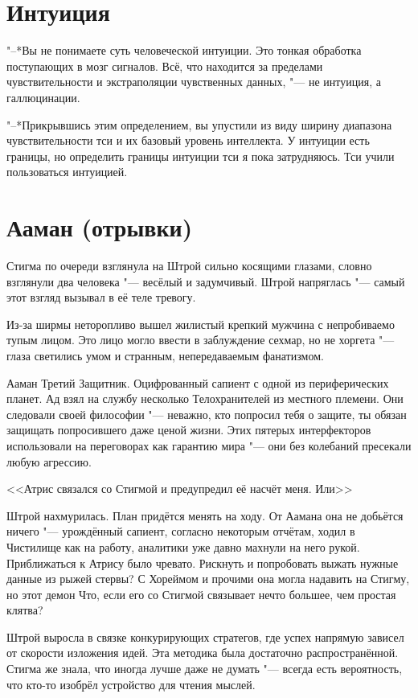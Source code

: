 \documentclass[a4paper,10pt]{book}
\newcommand{\ldotst}{\so{...}\xspace}
\newcommand{\ldotsq}{\so{?\hbox{\hspace{-.212em}}..}\xspace}
\begin{document}
\section{Интуиция}

"--*Вы не понимаете суть человеческой интуиции. Это тонкая обработка 
поступающих в мозг сигналов. Всё, что находится за пределами чувствительности и 
экстраполяции чувственных данных, "--- не интуиция, а галлюцинации.

"--*Прикрывшись этим определением, вы упустили из виду ширину диапазона 
чувствительности тси и их базовый уровень интеллекта. У интуиции есть границы, 
но определить границы интуиции тси я пока затрудняюсь. Тси учили пользоваться 
интуицией.

\section{Ааман (отрывки)}

Стигма по очереди взглянула на Штрой сильно косящими глазами, словно взглянули 
два человека "--- весёлый и задумчивый. Штрой напряглась "--- самый этот взгляд 
вызывал в её теле тревогу.

Из-за ширмы неторопливо вышел жилистый крепкий мужчина с непробиваемо тупым 
лицом. Это лицо могло ввести в заблуждение сехмар, но не хоргета "--- глаза 
светились умом и странным, непередаваемым фанатизмом.

Ааман Третий Защитник. Оцифрованный сапиент с одной из периферических планет. 
Ад взял на службу несколько Телохранителей из местного племени. Они следовали 
своей философии "--- неважно, кто попросил тебя о защите, ты обязан защищать 
попросившего даже ценой жизни. Этих пятерых интерфекторов использовали на 
переговорах как гарантию мира "--- они без колебаний пресекали любую агрессию.

<<Атрис связался со Стигмой и предупредил её насчёт меня. Или\ldotsq>>

Штрой нахмурилась. План придётся менять на ходу. От Аамана она не добьётся 
ничего "--- урождённый сапиент, согласно некоторым отчётам, ходил в Чистилище 
как на работу, аналитики уже давно махнули на него рукой. Приближаться к Атрису 
было чревато. Рискнуть и попробовать выжать нужные данные из рыжей стервы? С 
Хореймом и прочими она могла надавить на Стигму, но этот демон\ldotst Что, если 
его со Стигмой связывает нечто большее, чем простая клятва?

Штрой выросла в связке конкурирующих стратегов, где успех напрямую зависел от 
скорости изложения идей. Эта методика была достаточно распространённой. Стигма 
же знала, что иногда лучше даже не думать "--- всегда есть вероятность, что 
кто-то изобрёл устройство для чтения мыслей.
\end{document}
